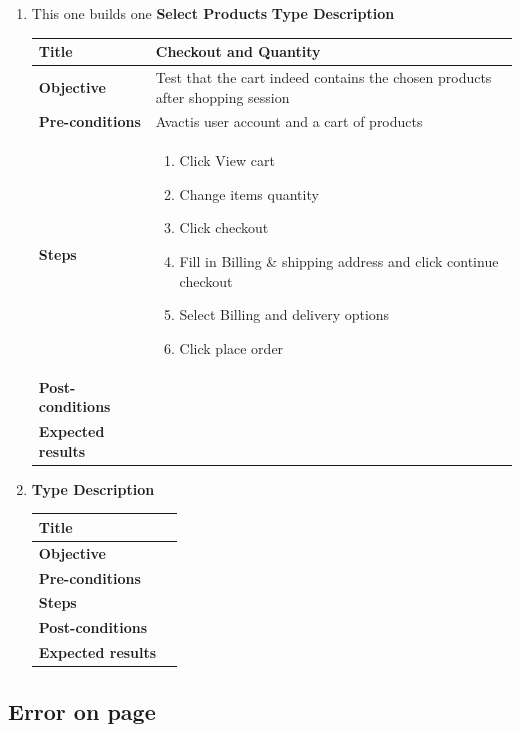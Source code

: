 \documentclass[UKenglish,12pt]{article}
\begin{document}
\begin{enumerate}
\item
This one builds one \textbf{Select Products}
\textbf{\hspace{0.3cm}Type\hspace{4.4cm} Description}
\newline \vspace{0.2cm}
\begin{tabular}{| p{5cm} | p{10cm} | }
	\hline
	 \textbf{Title} & Checkout and Quantity \\ \hline
	 \textbf{Objective} & Test that the cart indeed contains the chosen products after shopping session \\ \hline
	 \textbf{Pre-conditions} & Avactis user account and a cart of products \\ \hline
	 \textbf{Steps} & \begin{enumerate} \item Click View cart \item Change items quantity \item Click checkout \item Fill in Billing \& shipping address and click continue checkout \item Select Billing and delivery options \item Click place order
	 \end{enumerate} \\ \hline
	 \textbf{Post-conditions} & \\ \hline
	 \textbf{Expected results} & \\ 
	 \hline
\end{tabular} %



\item
\textbf{\hspace{0.3cm}Type\hspace{4.4cm} Description}
\newline \vspace{0.2cm}
\begin{tabular}{| p{5cm} | p{10cm} | }
	\hline
	 \textbf{Title} & \\ \hline
	 \textbf{Objective} & \\ \hline
	 \textbf{Pre-conditions} & \\ \hline
	 \textbf{Steps} & \\ \hline
	 \textbf{Post-conditions} & \\ \hline
	 \textbf{Expected results} & \\ 
	 \hline
\end{tabular} %









\end{enumerate}

\subsection{Error on page}
\end{document}
